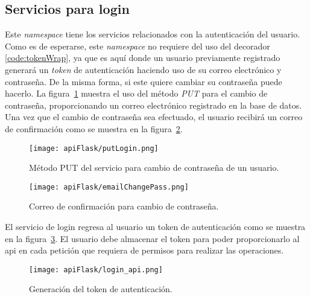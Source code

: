 \subsection{Servicios para login}

Este \textit{namespace} tiene los servicios relacionados con la autenticación del usuario. Como es de esperarse, este \textit{namespace} no requiere del uso del decorador \ref{code:tokenWrap}, ya que es aquí donde un usuario previamente registrado generará un \textit{token} de autenticación haciendo uso de su correo electrónico y contraseña. De la misma forma, si este quiere cambiar su contraseña puede hacerlo. La figura~\ref{img:putLogin} muestra el uso del método \textit{PUT} para el cambio de contraseña, proporcionando un correo electrónico registrado en la base de datos. Una vez que el cambio de contraseña sea efectuado, el usuario recibirá un correo de confirmación como se muestra en la figura~\ref{img:changePass}.

\begin{figure}[H]
  \centering
  \texttt{[image: apiFlask/putLogin.png]}
  \caption{Método PUT del servicio para cambio de contraseña de un usuario.}
  \label{img:putLogin}
\end{figure}

\begin{figure}[H]
  \centering
  \texttt{[image: apiFlask/emailChangePass.png]}
  \caption{Correo de confirmación para cambio de contraseña.}
  \label{img:changePass}
\end{figure}

El servicio de login regresa al usuario un token de autenticación como se muestra en la figura~\ref{img:loginApi}. El usuario debe almacenar el token para poder proporcionarlo al api en cada petición que requiera de permisos para realizar las operaciones.


\begin{figure}[H]
  \centering
  \texttt{[image: apiFlask/login\_api.png]}
  \caption{Generación del token de autenticación.}
  \label{img:loginApi}
\end{figure}